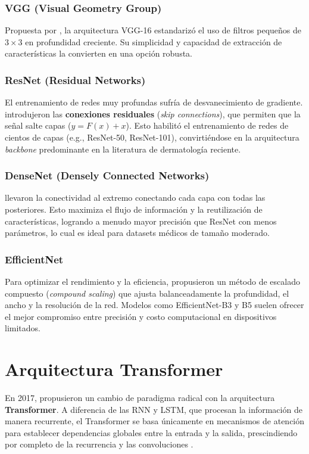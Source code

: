 \documentclass[11pt, a4paper]{article}
\begin{document}
\subsubsection{VGG (Visual Geometry Group)}
Propuesta por \cite{simonyan_very_2015}, la arquitectura VGG-16 estandarizó el uso de filtros pequeños de $3 \times 3$ en profundidad creciente. Su simplicidad y capacidad de extracción de características la convierten
en una opción robusta.

\subsubsection{ResNet (Residual Networks)}
El entrenamiento de redes muy profundas sufría de desvanecimiento de gradiente. \cite{he_deep_2015} introdujeron las \textbf{conexiones residuales} (\textit{skip connections}), que permiten que la señal salte capas 
($y = F(x) + x$). Esto habilitó el entrenamiento de redes de cientos de capas (e.g., ResNet-50, ResNet-101), convirtiéndose en la arquitectura \textit{backbone} predominante en la literatura de dermatología reciente.

\subsubsection{DenseNet (Densely Connected Networks)}
\cite{huang_densely_2018} llevaron la conectividad al extremo conectando cada capa con todas las posteriores. Esto maximiza el flujo de información y la reutilización de características, logrando a menudo mayor precisión
que ResNet con menos parámetros, lo cual es ideal para datasets médicos de tamaño moderado.

\subsubsection{EfficientNet}
Para optimizar el rendimiento y la eficiencia, \cite{tan_efficientnet_2020} propusieron un método de escalado compuesto (\textit{compound scaling}) que ajusta balanceadamente la profundidad, el ancho y la resolución de la red.
Modelos como EfficientNet-B3 y B5 suelen ofrecer el mejor compromiso entre precisión y costo computacional en dispositivos limitados.

\section{Arquitectura Transformer}

En 2017, \cite{vaswani_attention_nodate} propusieron un cambio de paradigma radical con la arquitectura \textbf{Transformer}. A diferencia de las RNN y LSTM, que procesan la información de
manera recurrente, el Transformer se basa únicamente en mecanismos de atención para establecer dependencias globales entre la entrada y la salida, prescindiendo por completo de la recurrencia
y las convoluciones \cite{vaswani_attention_nodate}.
\end{document}
